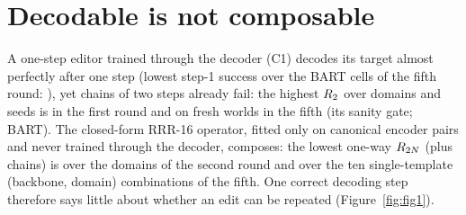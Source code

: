 \section{Decodable is not composable}\label{sec:phenomenon}
A one-step editor trained through the decoder (C1) decodes its target almost perfectly after one step (lowest step-1 success over the BART cells of the fifth round:
\CLoneVfiveCOneRoneMin{}), yet chains of two steps already fail: the highest $R_{2}$ over domains and seeds is
\CLoneVoneCOneRtwoMax{} in the first round and \CLoneVfiveCOneRtwoMax{} on fresh worlds in the fifth (its sanity gate; BART).
The closed-form RRR-16 operator, fitted only on canonical encoder pairs and never trained through the decoder, composes: the lowest one-way
$R_{2N}$ (plus chains) is \CLoneVtwoRRRRtwoNMin{} over the domains of the second round and \CLoneVfiveBaseMin{} over the ten
single-template (backbone, domain) combinations of the fifth. One correct decoding step therefore says little about whether an edit can be repeated
(Figure~\ref{fig:fig1}).
\begin{table}[t]\centering\small

\caption{Main results on both backbones (generated by \texttt{paper/scripts/table1.py}). Editor rows: month, fresh fifth-round
confirmation worlds, seed medians. Prediction rows: per-world agreement over all state-supervised cells of the fifth round. Unseen
templates: sixth round, month with held-out templates. Natural text: eighth round, WikiText sentences with one month. Steering, LoReFT and decode-and-re-encode: ninth round, month. Binding: seventh
round, BART only, eight seeds.}\label{tab:table1}
\end{table}

